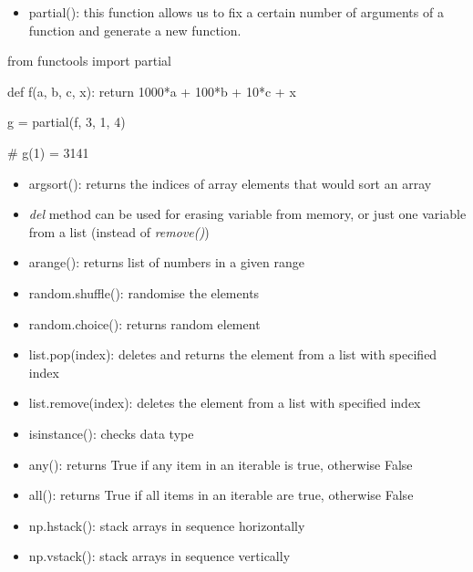\documentclass[
  letterpaper,
  DIV=11,
  numbers=noendperiod]{scrreprt}
\newenvironment{Shaded}{\begin{snugshade}}{\end{snugshade}}
\newcommand{\CommentTok}[1]{\textcolor[rgb]{0.37,0.37,0.37}{#1}}
\newcommand{\ControlFlowTok}[1]{\textcolor[rgb]{0.00,0.23,0.31}{#1}}
\newcommand{\DecValTok}[1]{\textcolor[rgb]{0.68,0.00,0.00}{#1}}
\newcommand{\ImportTok}[1]{\textcolor[rgb]{0.00,0.46,0.62}{#1}}
\newcommand{\KeywordTok}[1]{\textcolor[rgb]{0.00,0.23,0.31}{#1}}
\newcommand{\NormalTok}[1]{\textcolor[rgb]{0.00,0.23,0.31}{#1}}
\newcommand{\OperatorTok}[1]{\textcolor[rgb]{0.37,0.37,0.37}{#1}}
\providecommand{\tightlist}{%
  \setlength{\itemsep}{0pt}\setlength{\parskip}{0pt}}\usepackage{longtable,booktabs,array}
\begin{document}
\begin{itemize}
\tightlist
\item
  partial(): this function allows us to fix a certain number of
  arguments of a function and generate a new function.
\end{itemize}

\begin{Shaded}
\begin{Highlighting}[]
\ImportTok{from}\NormalTok{ functools }\ImportTok{import}\NormalTok{ partial}

\KeywordTok{def}\NormalTok{ f(a, b, c, x):}
    \ControlFlowTok{return} \DecValTok{1000}\OperatorTok{*}\NormalTok{a }\OperatorTok{+} \DecValTok{100}\OperatorTok{*}\NormalTok{b }\OperatorTok{+} \DecValTok{10}\OperatorTok{*}\NormalTok{c }\OperatorTok{+}\NormalTok{ x}

\NormalTok{g }\OperatorTok{=}\NormalTok{ partial(f, }\DecValTok{3}\NormalTok{, }\DecValTok{1}\NormalTok{, }\DecValTok{4}\NormalTok{)}

\CommentTok{\# g(1) = 3141}
\end{Highlighting}
\end{Shaded}

\begin{itemize}
\tightlist
\item
  argsort(): returns the indices of array elements that would sort an
  array
\item
  \emph{del} method can be used for erasing variable from memory, or
  just one variable from a list (instead of \emph{remove()})
\item
  arange(): returns list of numbers in a given range
\item
  random.shuffle(): randomise the elements
\item
  random.choice(): returns random element
\item
  list.pop(index): deletes and returns the element from a list with
  specified index
\item
  list.remove(index): deletes the element from a list with specified
  index
\item
  isinstance(): checks data type
\item
  any(): returns True if any item in an iterable is true, otherwise
  False
\item
  all(): returns True if all items in an iterable are true, otherwise
  False
\item
  np.hstack(): stack arrays in sequence horizontally
\item
  np.vstack(): stack arrays in sequence vertically
\end{itemize}
\end{document}
